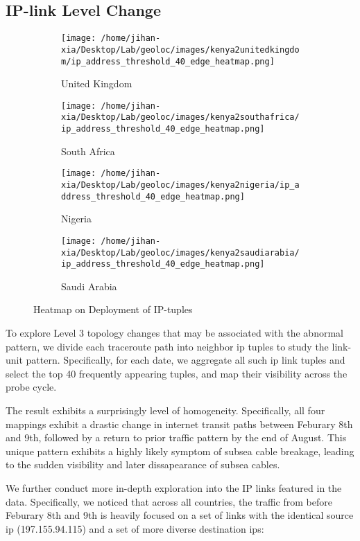 \documentclass[twocolumn]{article}
\begin{document}
\subsection{IP-link Level Change}
\begin{figure}[!htbp]
  \centering
  \begin{subfigure}{0.24\textwidth}
    \centering
    \texttt{[image: /home/jihan-xia/Desktop/Lab/geoloc/images/kenya2unitedkingdom/ip\_address\_threshold\_40\_edge\_heatmap.png]}
    \caption{United Kingdom}
  \end{subfigure}
  \begin{subfigure}{0.24\textwidth}
    \centering
    \texttt{[image: /home/jihan-xia/Desktop/Lab/geoloc/images/kenya2southafrica/ip\_address\_threshold\_40\_edge\_heatmap.png]}
    \caption{South Africa}
  \end{subfigure}
\begin{subfigure}{0.24\textwidth}
    \centering
    \texttt{[image: /home/jihan-xia/Desktop/Lab/geoloc/images/kenya2nigeria/ip\_address\_threshold\_40\_edge\_heatmap.png]}
    \caption{Nigeria}
    \end{subfigure}
  \begin{subfigure}{0.24\textwidth}
    \centering
    \texttt{[image: /home/jihan-xia/Desktop/Lab/geoloc/images/kenya2saudiarabia/ip\_address\_threshold\_40\_edge\_heatmap.png]}
    \caption{Saudi Arabia}
  \end{subfigure}
  \caption{Heatmap on Deployment of IP-tuples}
  \label{fig:iptupleheatmap}
\end{figure}
To explore Level 3 topology changes that may be associated with the abnormal pattern, we divide each traceroute path into neighbor ip tuples to study the link-unit pattern. Specifically, for each date, we aggregate all such ip link tuples and select the top 40 frequently appearing tuples, and map their visibility across the probe cycle.

The result exhibits a surprisingly level of homogeneity. Specifically, all four mappings exhibit a drastic change in internet transit paths between Feburary 8th and 9th, followed by a return to prior traffic pattern by the end of August. This unique pattern exhibits a highly likely symptom of subsea cable breakage, leading to the sudden visibility and later dissapearance of subsea cables.

We further conduct more in-depth exploration into the IP links featured in the data. Specifically, we noticed that across all countries, the traffic from before Feburary 8th and 9th is heavily focused on a set of links with the identical source ip (197.155.94.115) and a set of more diverse destination ips:
\end{document}
